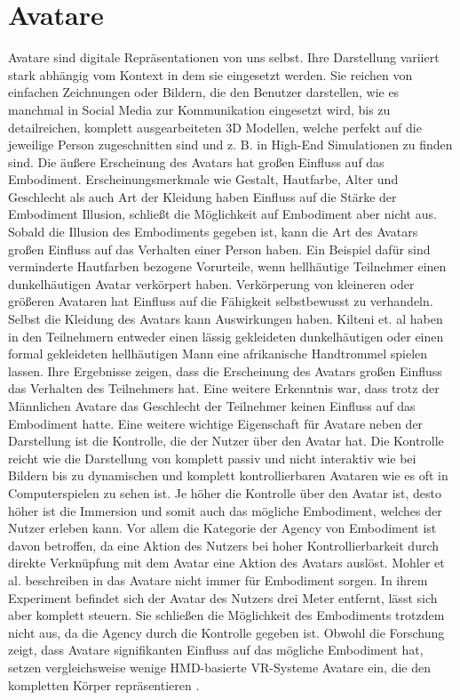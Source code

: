 \section{Avatare}
Avatare sind digitale Repräsentationen von uns selbst. Ihre Darstellung variiert stark abhängig vom Kontext in dem sie eingesetzt werden. Sie reichen von einfachen Zeichnungen oder Bildern, die den Benutzer darstellen, wie es manchmal in Social Media zur Kommunikation eingesetzt wird, bis zu detailreichen, komplett ausgearbeiteten 3D Modellen, welche perfekt auf die jeweilige Person zugeschnitten sind und z. B. in High-End Simulationen zu finden sind.
Die äußere Erscheinung des Avatars hat großen Einfluss auf das Embodiment. Erscheinungsmerkmale wie Gestalt, Hautfarbe, Alter und Geschlecht als auch Art der Kleidung haben Einfluss auf die Stärke der Embodiment Illusion, schließt die Möglichkeit auf Embodiment aber nicht aus. Sobald die Illusion des Embodiments gegeben ist, kann die Art des Avatars großen Einfluss auf das Verhalten einer Person haben. Ein Beispiel dafür sind verminderte Hautfarben bezogene Vorurteile, wenn hellhäutige Teilnehmer einen dunkelhäutigen Avatar verkörpert haben. Verkörperung von kleineren oder größeren Avataren hat Einfluss auf die Fähigkeit selbstbewusst zu verhandeln. Selbst die Kleidung des Avatars kann Auswirkungen haben. Kilteni et. al haben in\cite{Kilteni2013} den Teilnehmern entweder einen lässig gekleideten dunkelhäutigen oder einen formal gekleideten hellhäutigen Mann eine afrikanische Handtrommel spielen lassen. Ihre Ergebnisse zeigen, dass die Erscheinung des Avatars großen Einfluss das Verhalten des Teilnehmers hat. Eine weitere Erkenntnis war, dass trotz der Männlichen Avatare das Geschlecht der Teilnehmer keinen Einfluss auf das Embodiment hatte.
Eine weitere wichtige Eigenschaft für Avatare neben der Darstellung ist die Kontrolle, die der Nutzer über den Avatar hat. Die Kontrolle reicht wie die Darstellung von komplett passiv und nicht interaktiv wie bei Bildern bis zu dynamischen und komplett kontrollierbaren Avataren wie es oft in Computerspielen zu sehen ist. Je höher die Kontrolle über den Avatar ist, desto höher ist die Immersion und somit auch das mögliche Embodiment, welches der Nutzer erleben kann. Vor allem die Kategorie der Agency von Embodiment ist davon betroffen, da eine Aktion des Nutzers bei hoher Kontrollierbarkeit durch direkte Verknüpfung mit dem Avatar eine Aktion des Avatars auslöst.\cite{Biocca2014} Mohler et al. beschreiben in \cite{Mohler2010} das Avatare nicht immer für Embodiment sorgen. In ihrem Experiment befindet sich der Avatar des Nutzers drei Meter entfernt, lässt sich aber komplett steuern. Sie schließen die Möglichkeit des Embodiments trotzdem nicht aus, da die Agency durch die Kontrolle gegeben ist.
Obwohl die Forschung zeigt, dass Avatare signifikanten Einfluss auf das mögliche Embodiment hat, setzen vergleichsweise wenige HMD-basierte VR-Systeme Avatare ein, die den kompletten Körper repräsentieren \cite{Pan2017}.

